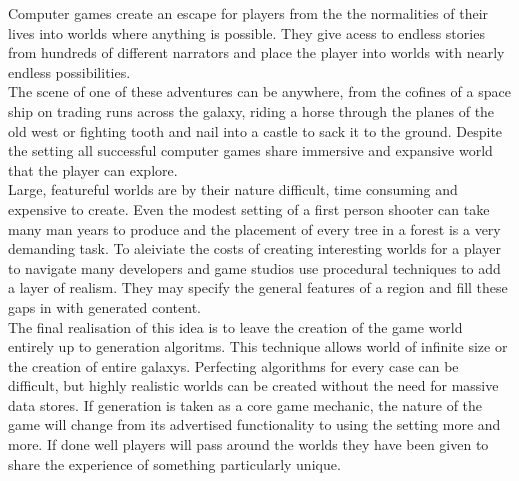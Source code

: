 Computer games create an escape for players from the the normalities of their
lives into worlds where anything is possible. They give acess to endless stories
from hundreds of different narrators and place the player into worlds with nearly
endless possibilities.\\

The scene of one of these adventures can be anywhere, from the cofines of a 
space ship on trading runs across the galaxy, riding a horse through the planes
of the old west or fighting tooth and nail into a castle to sack it to the 
ground. Despite the setting all successful computer games share immersive and 
expansive world that the player can explore. \\

Large, featureful worlds are by their nature difficult, time consuming and 
expensive to create. Even the modest setting of a first person shooter can take
many man years to produce and the placement of every tree in a forest is a very
demanding task. To aleiviate the costs of creating interesting worlds for a 
player to navigate many developers and game studios use procedural techniques to
add a layer of realism. They may specify the general features of a region and 
fill these gaps in with generated content.\\

The final realisation of this idea is to leave the creation of the game world 
entirely up to generation algoritms. This technique allows world of infinite size
or the creation of entire galaxys. Perfecting algorithms for every case can be 
difficult, but highly realistic worlds can be created without the need for 
massive data stores. If generation is taken as a core game mechanic, the nature
of the game will change from its advertised functionality to using the setting 
more and more. If done well players will pass around the worlds they have been
given to share the experience of something particularly unique.\\
